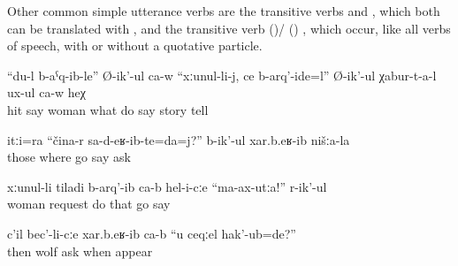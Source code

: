 Other common simple utterance verbs are the transitive verbs  and , which both can be translated with , and the transitive verb  ()\slash{} () , which occur, like all verbs of speech, with or without a quotative particle.
%
\begin{exe}
	\ex	\label{ex:I hit my wife, what should I do, he says, he is telling the stories}
	\gll	``du-l	b-aˁq-ib-le''	Ø-ik'-ul	ca-w	``xːunul-li-j,	ce	b-arq'-ide=l''	Ø-ik'-ul	χabur-t-a-l	ux-ul	ca-w	heχ\\
			hit	say		woman	what	do	say	story	tell			\\
	\glt	{}

	\ex	\label{ex:They asked us, where did you come from}
	\gll	itːi=ra	``čina-r	sa-d-eʁ-ib-te=da=j?''	b-ik'-ul	xar.b.eʁ-ib	nišːa-la\\
		those	where	go	say	ask	\\
	\glt	{}

	\ex	\label{ex:‎His wife begged him, Do not go}
	\gll	xːunul-li	tiladi	b-arq'-ib	ca-b	hel-i-cːe	``ma-ax-utːa!''	r-ik'-ul\\
		woman	request	do		that	go	say\\
	\glt	{}
	
	\ex	\label{ex:‎‎Then they asked the wolf, When were you born?}
	\gll	c'il	bec'-li-cːe	xar.b.eʁ-ib	ca-b	``u	ceqːel	hak'-ub=de?''\\
		then	wolf	ask			when	appear\\
	\glt	{}
	
\end{exe}

